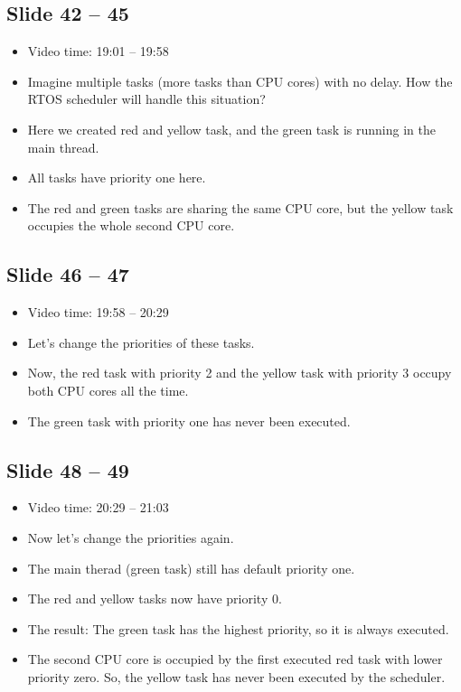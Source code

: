 \documentclass[12pt, a4paper]{article}
\begin{document}
	\subsection{Slide 42 -- 45}
	\begin{itemize}
		\item Video time: 19:01 -- 19:58
		\item Imagine multiple tasks (more tasks than CPU cores) with no delay. How the RTOS scheduler will handle this situation?
		\item Here we created red and yellow task, and the green task is running in the main thread.
		\item All tasks have priority one here.
		\item The red and green tasks are sharing the same CPU core, but the yellow task occupies the whole second CPU core.
	\end{itemize}

	\subsection{Slide 46 -- 47}
	\begin{itemize}
		\item Video time: 19:58 -- 20:29
		\item Let's change the priorities of these tasks.
		\item Now, the red task with priority 2 and the yellow task with priority 3 occupy both CPU cores all the time.
		\item The green task with priority one has never been executed.
	\end{itemize}

	\subsection{Slide 48 -- 49}
	\begin{itemize}
		\item Video time: 20:29 -- 21:03
		\item Now let's change the priorities again.
		\item The main therad (green task) still has default priority one.
		\item The red and yellow tasks now have priority 0.
		\item The result: The green task has the highest priority, so it is always executed.
		\item The second CPU core is occupied by the first executed red task with lower priority zero. So, the yellow task has never been executed by the scheduler.
	\end{itemize}
\end{document}

